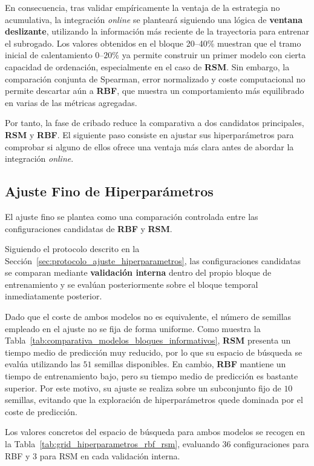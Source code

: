 En consecuencia, tras validar empíricamente la ventaja de la estrategia no
acumulativa, la integración \textit{online} se planteará siguiendo una lógica de \textbf{ventana deslizante}, utilizando la información más reciente de la trayectoria para entrenar el subrogado. Los valores obtenidos en el bloque 20--40\% muestran que el tramo inicial de calentamiento \(0\)--\(20\%\) ya permite construir un primer modelo con cierta capacidad de ordenación, especialmente en el caso de \textbf{RSM}. Sin embargo, la comparación conjunta de Spearman, error normalizado y coste computacional no permite descartar aún a \textbf{RBF}, que muestra un comportamiento más equilibrado en varias de las métricas agregadas.

Por tanto, la fase de cribado reduce la comparativa a dos candidatos
principales, \textbf{RSM} y \textbf{RBF}. El siguiente paso consiste en ajustar sus hiperparámetros para comprobar si alguno de ellos ofrece una ventaja más clara antes de abordar la integración \textit{online}.

\subsection{Ajuste Fino de Hiperparámetros}

El ajuste fino se plantea como una comparación controlada entre las
configuraciones candidatas de \textbf{RBF} y \textbf{RSM}.

Siguiendo el protocolo descrito en la Sección~\ref{sec:protocolo_ajuste_hiperparametros}, las configuraciones candidatas se comparan mediante \textbf{validación interna} dentro del propio bloque de entrenamiento y se evalúan posteriormente sobre el bloque temporal inmediatamente posterior.

Dado que el coste de ambos modelos no es equivalente, el número de semillas
empleado en el ajuste no se fija de forma uniforme. Como muestra la
Tabla~\ref{tab:comparativa_modelos_bloques_informativos}, \textbf{RSM} presenta un tiempo medio de predicción muy reducido, por lo que su espacio de búsqueda se evalúa utilizando las \(51\) semillas disponibles. En cambio, \textbf{RBF} mantiene un tiempo de entrenamiento bajo, pero su tiempo medio de predicción es bastante superior. Por este motivo, su ajuste se realiza sobre un subconjunto fijo de \(10\) semillas, evitando que la exploración de hiperparámetros quede dominada por el coste de predicción.

Los valores concretos del espacio de búsqueda para ambos modelos se recogen en la Tabla~\ref{tab:grid_hiperparametros_rbf_rsm}, evaluando 36 configuraciones para RBF y 3 para RSM en cada validación interna.

